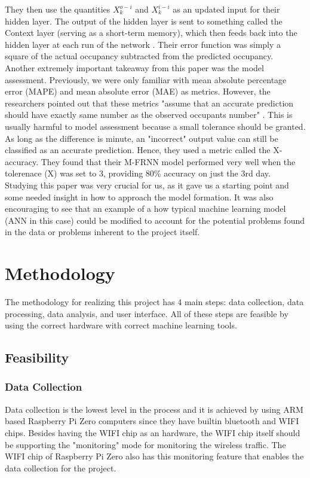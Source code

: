 \documentclass[journal, 12pt]{IEEEtran}
\begin{document}
\medskip
\noindent They then use the quantities $X_{k}^{o-i}$ and $X_{k}^{i-i}$ as an updated input for their hidden layer. The output of the hidden layer is sent to something called the Context layer (serving as a short-term memory), which then feeds back into the hidden layer at each run of the network \cite{wang2018occupancy}. Their error function was simply a square of the actual occupancy subtracted from the predicted occupancy\cite{wang2018occupancy}. \\

\noindent Another extremely important takeaway from this paper was the model assessment. Previously, we were only familiar with mean absolute percentage error (MAPE) and mean absolute error (MAE) as metrics. However, the researchers pointed out that these metrics "assume that an accurate prediction should have exactly
same number as the observed occupants number" \cite{wang2018occupancy}. This is usually harmful to model assessment because a small tolerance should be granted. As long as the difference is minute, an "incorrect" output value can still be classified as an accurate prediction. Hence, they used a metric called the X-accuracy. They found that their M-FRNN model performed very well when the tolerenace (X) was set to 3, providing 80\% accuracy on just the 3rd day. \\

\noindent Studying this paper was very crucial for us, as it gave us a starting point and some needed insight in how to approach the model formation. It was also encouraging to see that an example of a how typical machine learning model (ANN in this case) could be modified to account for the potential problems found in the data or problems inherent to the project itself. 



\section{Methodology}
\noindent The methodology for realizing this project has 4 main steps: data collection, data processing, data analysis, and user interface. All of these steps are feasible by using the correct hardware with correct machine learning tools.

\subsection{Feasibility}
\subsubsection{Data Collection} Data collection is the lowest level in the process and it is achieved by using ARM based Raspberry Pi Zero computers since they have builtin bluetooth and WIFI chips. Besides having the WIFI chip as an hardware, the WIFI chip itself should be supporting the "monitoring" mode for monitoring the wireless traffic. The WIFI chip of Raspberry Pi Zero also has this monitoring feature that enables the data collection for the project.
\end{document}
